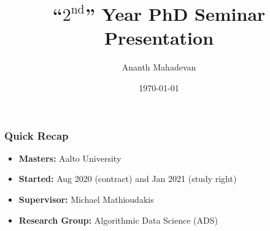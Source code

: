 \documentclass[pdf]{beamer}
\title{``$2^{\text{nd}}$'' Year PhD Seminar Presentation}
\author[Ananth Mahadevan]{Ananth Mahadevan}
\date{\today}
\begin{document}
\begin{frame}
    \titlepage
\end{frame}

\begin{frame}
    \frametitle{Quick Recap}
    \begin{itemize}
        \item \textbf{Masters:} Aalto University
        \item \textbf{Started:} Aug 2020 (contract) and Jan 2021 (study right) 
        \item \textbf{Supervisor:} Michael Mathioudakis
        \item \textbf{Research Group:} Algorithmic Data Science (ADS)
    \end{itemize}

    

\end{frame}
\end{document}
